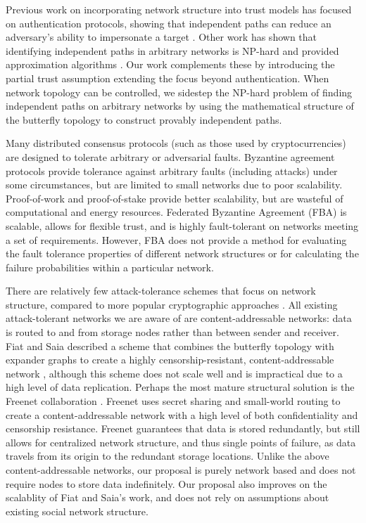 \documentclass{sig-alternate-05-2015}
\begin{document}
Previous work on incorporating network structure into
trust models has focused on authentication
protocols, showing that independent paths can reduce an adversary's ability
to impersonate a target
\cite{levien_attack-resistant_2009}.
Other work has shown that identifying independent paths in arbitrary networks
is NP-hard and provided approximation algorithms
\cite{reiter_resilient_1998}.
Our work complements these by introducing the partial trust assumption
extending the focus beyond authentication.
When network topology can be controlled, we sidestep the NP-hard problem of finding
independent paths on arbitrary networks by using the mathematical structure of
the butterfly topology to construct provably independent paths.

Many distributed consensus protocols (such as those used by cryptocurrencies)
are designed to tolerate arbitrary or adversarial faults.
Byzantine agreement protocols
\cite{lamport_byzantine_1982,castro_practical_1999}
provide tolerance against arbitrary faults (including attacks) under
some circumstances, but are limited to small networks due to poor scalability.
Proof-of-work \cite{dwork_pricing_1993,nakamoto_bitcoin:_2008}
and proof-of-stake \cite{king_ppcoin:_2012}
provide better scalability,
but are wasteful of computational and energy resources.
Federated Byzantine Agreement (FBA) \cite{mazieres_stellar_2015}
is scalable, allows for flexible trust,
and is highly fault-tolerant on networks meeting a set of requirements.
However, FBA does not provide a method for evaluating the
fault tolerance properties of different network structures
or for calculating the failure probabilities within a particular network.

There are relatively few attack-tolerance schemes
that focus on network structure,
compared to more popular cryptographic approaches
\cite{ferguson_practical_2003}.
All existing attack-tolerant networks we are aware of are content-addressable
networks: data is routed to and from storage nodes rather than between sender
and receiver.
Fiat and Saia described a scheme that combines the butterfly topology
with expander graphs to create a highly censorship-resistant,
content-addressable network \cite{fiat_censorship_2002},
although this scheme does not scale well and is impractical due to a
high level of data replication.
Perhaps the most mature structural solution is the Freenet collaboration
\cite{clarke_freenet:_2001}.
Freenet uses secret sharing
\cite{shamir_how_1979, blakley_safeguarding_1979}
and small-world routing
\cite{zhang_using_2002,kleinberg_small-world_2000}
to create a content-addressable network with a high level of both
confidentiality and censorship resistance.
Freenet guarantees that data is stored redundantly,
but still allows for centralized network structure,
and thus single points of failure,
as data travels from its origin to the redundant storage locations.
Unlike the above content-addressable networks, our proposal is purely network based
and does not require nodes to store data indefinitely.
Our proposal also improves on the scalablity of Fiat and Saia's work,
and does not rely on assumptions about existing social network structure.
\end{document}
